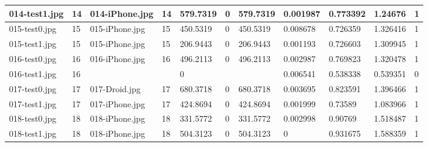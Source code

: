 \begin{landscape}
\begin{longtable}{|p{2cm}|p{1cm}|p{2cm}|p{1cm}|p{2cm}|p{1cm}|p{2cm}|p{2cm}|p{2cm}|p{2cm}|p{1cm}|}
		014-test1.jpg   & 14               & 014-iPhone.jpg        & 14                          & 579.7319              & 0                       & 579.7319                   & 0.001987              & 0.773392              & 1.24676                  & 1                \\ \hline
		015-test0.jpg   & 15               & 015-iPhone.jpg        & 15                          & 450.5319              & 0                       & 450.5319                   & 0.008678              & 0.726359              & 1.326416                 & 1                \\ \hline
		015-test1.jpg   & 15               & 015-iPhone.jpg        & 15                          & 206.9443              & 0                       & 206.9443                   & 0.001193              & 0.726603              & 1.309945                 & 1                \\ \hline
		016-test0.jpg   & 16               & 016-iPhone.jpg        & 16                          & 496.2113              & 0                       & 496.2113                   & 0.002987              & 0.769823              & 1.320478                 & 1                \\ \hline
		016-test1.jpg   & 16               &                       &                             & 0                     &                         &                            & 0.006541              & 0.538338              & 0.539351                 & 0                \\ \hline
		017-test0.jpg   & 17               & 017-Droid.jpg         & 17                          & 680.3718              & 0                       & 680.3718                   & 0.003695              & 0.823591              & 1.396466                 & 1                \\ \hline
		017-test1.jpg   & 17               & 017-iPhone.jpg        & 17                          & 424.8694              & 0                       & 424.8694                   & 0.001999              & 0.73589               & 1.083966                 & 1                \\ \hline
		018-test0.jpg   & 18               & 018-iPhone.jpg        & 18                          & 331.5772              & 0                       & 331.5772                   & 0.002998              & 0.90769               & 1.518487                 & 1                \\ \hline
		018-test1.jpg   & 18               & 018-iPhone.jpg        & 18                          & 504.3123              & 0                       & 504.3123                   & 0                     & 0.931675              & 1.588359                 & 1                \\ \hline

\end{longtable}
\end{landscape}
